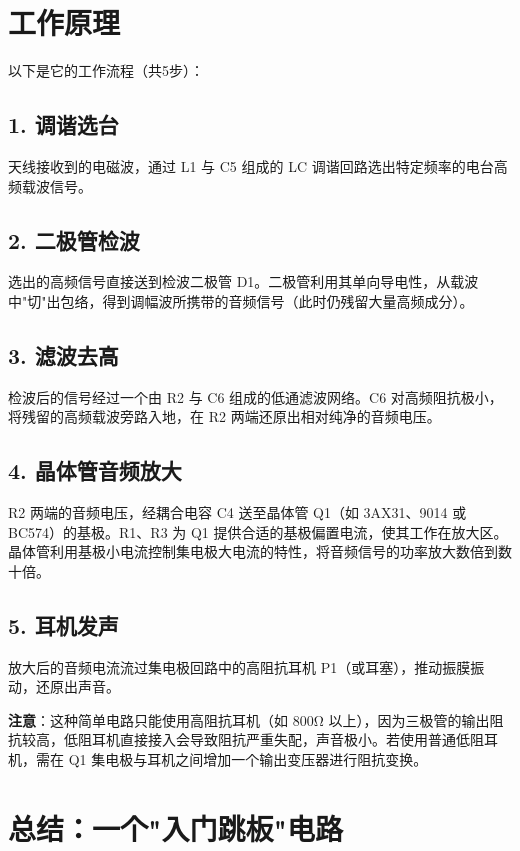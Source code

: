 \documentclass[12pt,UTF8]{ctexbook}
\begin{document}
\section{工作原理}

以下是它的工作流程（共5步）：

\subsection{1. 调谐选台}

天线接收到的电磁波，通过 L1 与 C5 组成的 LC 调谐回路选出特定频率的电台高频载波信号。

\subsection{2. 二极管检波}

选出的高频信号直接送到检波二极管 D1。二极管利用其单向导电性，从载波中"切"出包络，得到调幅波所携带的音频信号（此时仍残留大量高频成分）。

\subsection{3. 滤波去高}

检波后的信号经过一个由 R2 与 C6 组成的低通滤波网络。C6 对高频阻抗极小，将残留的高频载波旁路入地，在 R2 两端还原出相对纯净的音频电压。

\subsection{4. 晶体管音频放大}

R2 两端的音频电压，经耦合电容 C4 送至晶体管 Q1（如 3AX31、9014 或 BC574）的基极。R1、R3 为 Q1 提供合适的基极偏置电流，使其工作在放大区。晶体管利用基极小电流控制集电极大电流的特性，将音频信号的功率放大数倍到数十倍。

\subsection{5. 耳机发声}

放大后的音频电流流过集电极回路中的高阻抗耳机 P1（或耳塞），推动振膜振动，还原出声音。

\textbf{注意}：这种简单电路只能使用高阻抗耳机（如 800Ω 以上），因为三极管的输出阻抗较高，低阻耳机直接接入会导致阻抗严重失配，声音极小。若使用普通低阻耳机，需在 Q1 集电极与耳机之间增加一个输出变压器进行阻抗变换。

\section{总结：一个"入门跳板"电路}
\end{document}
